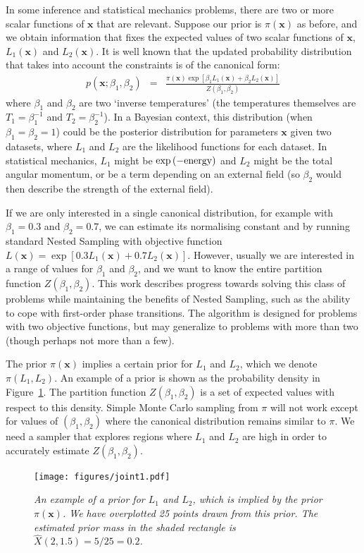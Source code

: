 \documentclass[journal,article,accept,moreauthors,pdftex,12pt,a4paper]{mdpi}
\newcommand{\xx}{\boldsymbol{x}}
\begin{document}
In some inference and
statistical mechanics problems, there are two or more scalar functions of
$\xx$ that are relevant. Suppose our prior is $\pi(\xx)$ as before, and
we obtain information that fixes the expected values of two scalar
functions of $\xx$, $L_1(\xx)$ and $L_2(\xx)$.
It is well known that the
updated probability distribution that takes into account the constraints is
of the canonical form:
\begin{eqnarray}
p(\xx; \beta_1, \beta_2) &=& \frac{\pi(\xx)\exp\left[\beta_1L_1(\xx)+\beta_2L_2(\xx)\right]}
{Z(\beta_1, \beta_2)}
\end{eqnarray}
where $\beta_1$ and $\beta_2$ are two `inverse temperatures' (the temperatures
themselves are $T_1 = \beta_1^{-1}$ and $T_2 = \beta_2^{-1}$).
In a Bayesian
context, this distribution (when $\beta_1 = \beta_2 = 1$) could be the
posterior distribution for parameters $\xx$
given two datasets, where $L_1$ and $L_2$ are the
likelihood functions for each dataset. In statistical mechanics, $L_1$ might
be $\exp\left(-\textnormal{energy}\right)$ and $L_2$ might be the total
angular momentum, or be a term depending on an external field (so $\beta_2$
would then describe the strength of the external field).

If we are only interested in a single canonical distribution, for example
with $\beta_1 = 0.3$ and $\beta_2 = 0.7$, we can estimate its normalising
constant and by running standard Nested Sampling with objective function
$L(\xx) = \exp\left[0.3L_1(\xx) + 0.7L_2(\xx)\right]$. However, usually we
are interested in a range of values for $\beta_1$ and $\beta_2$, and we
want to know the entire partition function $Z(\beta_1, \beta_2)$.
This work describes
progress towards solving this class of problems while maintaining the benefits
of Nested Sampling, such as the ability to cope with first-order phase
transitions. The algorithm is designed for problems with two objective
functions, but may generalize to problems with more than two (though perhaps
not more than a few).

The prior $\pi(\xx)$ implies a certain prior for $L_1$ and $L_2$, which we
denote $\pi(L_1, L_2)$. An example of a prior is shown as the
probability density in Figure~\ref{fig:joint1}. The partition function
$Z(\beta_1, \beta_2)$ is a set of expected values with respect to this density.
Simple Monte Carlo sampling from $\pi$ will not work except for values of
$(\beta_1, \beta_2)$ where the canonical distribution remains similar to $\pi$.
We need a sampler that explores regions where $L_1$ and $L_2$ are high in order
to accurately estimate $Z(\beta_1, \beta_2)$.
\begin{figure}
\centering
\texttt{[image: figures/joint1.pdf]}
\caption{\it An example of a prior for $L_1$ and $L_2$, which is implied by
the prior $\pi(\xx)$. We have overplotted 25 points drawn from this prior.
The estimated prior mass in the shaded rectangle is
$\hat{X}(2, 1.5) = 5/25 = 0.2$.
\label{fig:joint1}}
\end{figure}
\end{document}
